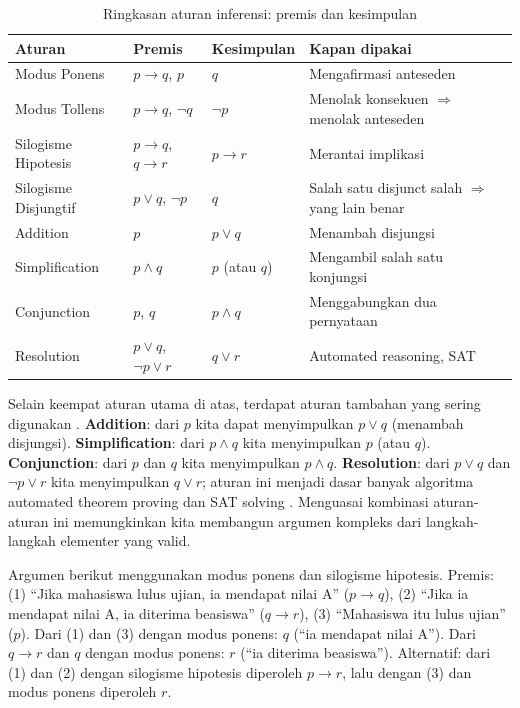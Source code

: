 \begin{table}[htbp]
\centering
\small
\begin{tabular}{|>{\raggedright\arraybackslash}p{2.5cm}|>{\raggedright\arraybackslash}p{3.2cm}|>{\raggedright\arraybackslash}p{2.35cm}|>{\raggedright\arraybackslash}p{3.2cm}|}
\hline
\textbf{Aturan} & \textbf{Premis} & \textbf{Kesimpulan} & \textbf{Kapan dipakai} \\
\hline
Modus Ponens & $p \rightarrow q$, $p$ & $q$ & Mengafirmasi anteseden \\
\hline
Modus Tollens & $p \rightarrow q$, $\neg q$ & $\neg p$ & Menolak konsekuen $\Rightarrow$ menolak anteseden \\
\hline
Silogisme Hipotesis & $p \rightarrow q$, $q \rightarrow r$ & $p \rightarrow r$ & Merantai implikasi \\
\hline
Silogisme Disjungtif & $p \vee q$, $\neg p$ & $q$ & Salah satu disjunct salah $\Rightarrow$ yang lain benar \\
\hline
Addition & $p$ & $p \vee q$ & Menambah disjungsi \\
\hline
Simplification & $p \wedge q$ & $p$ (atau $q$) & Mengambil salah satu konjungsi \\
\hline
Conjunction & $p$, $q$ & $p \wedge q$ & Menggabungkan dua pernyataan \\
\hline
Resolution & $p \vee q$, $\neg p \vee r$ & $q \vee r$ & Automated reasoning, SAT \\
\hline
\end{tabular}
\caption{Ringkasan aturan inferensi: premis dan kesimpulan}
\label{tab:aturan-inferensi}
\end{table}

Selain keempat aturan utama di atas, terdapat aturan tambahan yang sering digunakan \cite{rosen2019,cmu_natded}. \textbf{Addition}: dari $p$ kita dapat menyimpulkan $p \vee q$ (menambah disjungsi). \textbf{Simplification}: dari $p \wedge q$ kita menyimpulkan $p$ (atau $q$). \textbf{Conjunction}: dari $p$ dan $q$ kita menyimpulkan $p \wedge q$. \textbf{Resolution}: dari $p \vee q$ dan $\neg p \vee r$ kita menyimpulkan $q \vee r$; aturan ini menjadi dasar banyak algoritma automated theorem proving dan SAT solving \cite{wikipedia_sat,cmu_sat}. Menguasai kombinasi aturan-aturan ini memungkinkan kita membangun argumen kompleks dari langkah-langkah elementer yang valid.

\begin{contoh}
Argumen berikut menggunakan modus ponens dan silogisme hipotesis. Premis: (1) ``Jika mahasiswa lulus ujian, ia mendapat nilai A'' ($p \rightarrow q$), (2) ``Jika ia mendapat nilai A, ia diterima beasiswa'' ($q \rightarrow r$), (3) ``Mahasiswa itu lulus ujian'' ($p$). Dari (1) dan (3) dengan modus ponens: $q$ (``ia mendapat nilai A''). Dari $q \rightarrow r$ dan $q$ dengan modus ponens: $r$ (``ia diterima beasiswa''). Alternatif: dari (1) dan (2) dengan silogisme hipotesis diperoleh $p \rightarrow r$, lalu dengan (3) dan modus ponens diperoleh $r$.
\end{contoh}

